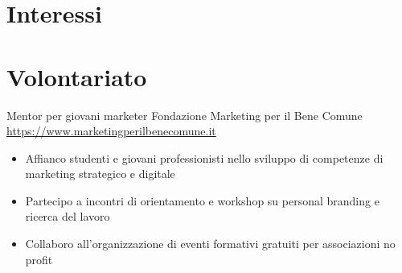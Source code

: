 \documentclass[a4paper, serif, 10pt]{moderncv}
\begin{document}
\section{Interessi}

\section{Volontariato}

        {Mentor per giovani marketer}
        {Fondazione Marketing per il Bene Comune}
        {\url{https://www.marketingperilbenecomune.it}}
        {}
        {\begin{itemize}
\item Affianco studenti e giovani professionisti nello sviluppo di competenze di marketing strategico e digitale
\item Partecipo a incontri di orientamento e workshop su personal branding e ricerca del lavoro
\item Collaboro all'organizzazione di eventi formativi gratuiti per associazioni no profit
\end{itemize}}
    
\end{document}
